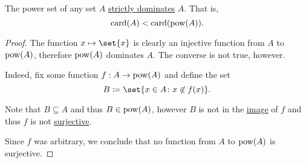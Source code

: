 \begin{theorem}\label{thm:cantor_power_set_theorem}
  The power set of any set \( A \) \hyperref[def:equinumerosity]{strictly dominates} \( A \). That is,
  \begin{equation*}
    \operatorname{card}(A) < \operatorname{card}(\operatorname{pow}(A)).
  \end{equation*}
\end{theorem}
\begin{proof}
  The function \( x \mapsto \set{ x } \) is clearly an injective function from \( A \) to \( \operatorname{pow}(A) \), therefore \( \operatorname{pow}(A) \) dominates \( A \). The converse is not true, however.

  Indeed, fix some function \( f: A \to \operatorname{pow}(A) \) and define the set
  \begin{equation*}
    B \coloneqq \set{ x \in A \colon x \not\in f(x) }.
  \end{equation*}

  Note that \( B \subseteq A \) and thus \( B \in \operatorname{pow}(A) \), however \( B \) is not in the \hyperref[def:multi_valued_function/image]{image} of \( f \) and thus \( f \) is not \hyperref[def:function_invertibility/surjective]{surjective}.

  Since \( f \) was arbitrary, we conclude that no function from \( A \) to \( \operatorname{pow}(A) \) is surjective.
\end{proof}

